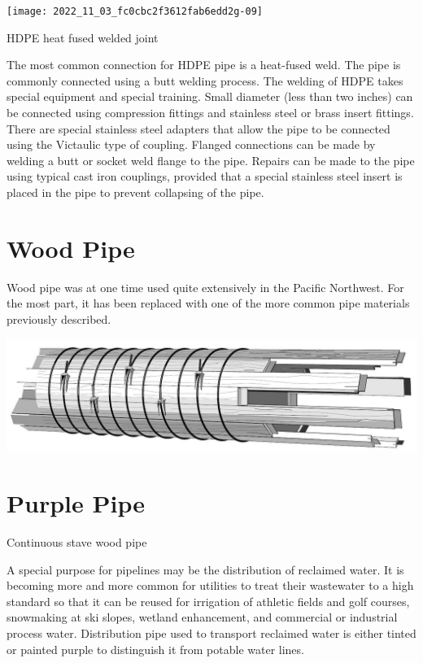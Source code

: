\documentclass[10pt]{article}
\begin{document}
\texttt{[image: 2022\_11\_03\_fc0cbc2f3612fab6edd2g-09]}

HDPE heat fused welded joint

The most common connection for HDPE pipe is a heat-fused weld. The pipe is commonly connected using a butt welding process. The welding of HDPE takes special equipment and special training. Small diameter (less than two inches) can be connected using compression fittings and stainless steel or brass insert fittings. There are special stainless steel adapters that allow the pipe to be connected using the Victaulic type of coupling. Flanged connections can be made by welding a butt or socket weld flange to the pipe. Repairs can be made to the pipe using typical cast iron couplings, provided that a special stainless steel insert is placed in the pipe to prevent collapsing of the pipe.

\section{Wood Pipe}
Wood pipe was at one time used quite extensively in the Pacific Northwest. For the most part, it has been replaced with one of the more common pipe materials previously described.

\includegraphics[max width=\textwidth]{2022_11_03_fc0cbc2f3612fab6edd2g-09(1)}

\section{Purple Pipe}
Continuous stave wood pipe

A special purpose for pipelines may be the distribution of reclaimed water. It is becoming more and more common for utilities to treat their wastewater to a high standard so that it can be reused for irrigation of athletic fields and golf courses, snowmaking at ski slopes, wetland enhancement, and commercial or industrial process water. Distribution pipe used to transport reclaimed water is either tinted or painted purple to distinguish it from potable water lines.
\end{document}
